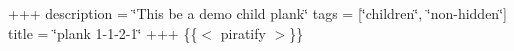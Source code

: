 +++ description = \char`\"{}\+This be a demo child plank\char`\"{} tags = \mbox{[}\char`\"{}children\char`\"{}, \char`\"{}non-\/hidden\char`\"{}\mbox{]} title = \char`\"{}plank 1-\/1-\/2-\/1\char`\"{} +++ \{\{$<$ piratify $>$\}\} 